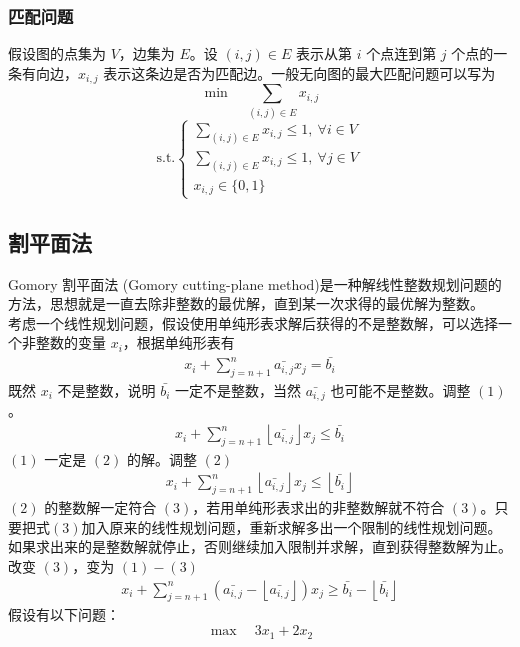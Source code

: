 \subsubsection{匹配问题}
假设图的点集为 $V$，边集为 $E$。设 $(i, j) \in E$ 表示从第 $i$ 个点连到第 $j$ 个点的一条有向边，$x_{i, j}$ 表示这条边是否为匹配边。一般无向图的最大匹配问题可以写为
$$
\min \quad \sum_{(i, j) \in E} x_{i, j}
$$
$$
\text{s.t.} 
\begin{cases}
    \sum_{(i, j) \in E} x_{i, j} \le 1, \ \forall i \in V \\
    \sum_{(i, j) \in E} x_{i, j} \le 1, \ \forall j \in V \\
    x_{i, j} \in \{0, 1\}
\end{cases}
$$

\subsection{割平面法}
Gomory 割平面法 (Gomory cutting-plane method)是一种解线性整数规划问题的方法，思想就是一直去除非整数的最优解，直到某一次求得的最优解为整数。 \\
考虑一个线性规划问题，假设使用单纯形表求解后获得的不是整数解，可以选择一个非整数的变量 $x_i$，根据单纯形表有
\begin{align}
    x_i + \sum_{j = n + 1}^n \bar{a_{i, j}}x_j = \bar{b_i} \tag{1}
\end{align}
既然 $x_i$ 不是整数，说明 $\bar{b_i}$ 一定不是整数，当然 $\bar{a_{i, j}}$ 也可能不是整数。调整 $(1)$。
\begin{align}
    x_i + \sum_{j = n + 1}^n \left\lfloor \bar{a_{i, j}} \right\rfloor x_j \le \bar{b_i} \tag{2}
\end{align}
$(1)$ 一定是 $(2)$ 的解。调整 $(2)$
\begin{align}
    x_i + \sum_{j = n + 1}^n \left\lfloor \bar{a_{i, j}} \right\rfloor x_j \le \left\lfloor \bar{b_i} \right\rfloor \tag{3}
\end{align}
$(2)$ 的整数解一定符合 $(3)$，若用单纯形表求出的非整数解就不符合 $(3)$。只要把式$(3)$加入原来的线性规划问题，重新求解多出一个限制的线性规划问题。如果求出来的是整数解就停止，否则继续加入限制并求解，直到获得整数解为止。 \\
改变 $(3)$，变为 $(1) - (3)$
\begin{align}
    x_i + \sum_{j = n + 1}^n (\bar{a_{i, j}} - \left\lfloor \bar{a_{i, j}} \right\rfloor) x_j \ge \bar{b_i} - \left\lfloor \bar{b_i} \right\rfloor \tag{3}
\end{align}
假设有以下问题：
$$
\max \quad 3x_1 + 2x_2
$$
